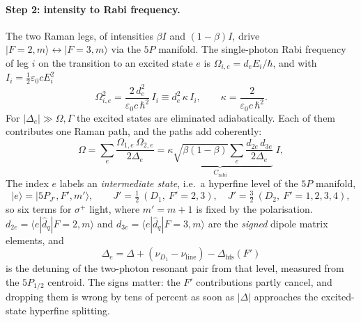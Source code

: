 \paragraph{Step 2: intensity to Rabi frequency.}
The two Raman legs, of intensities $\beta I$ and $(1-\beta)I$, drive
$|F{=}2,m\rangle\leftrightarrow|F{=}3,m\rangle$ via the $5P$ manifold. The
single-photon Rabi frequency of leg $i$ on the transition to an excited state
$e$ is $\Omega_{i,e}=d_e E_i/\hbar$, and with $I_i=\tfrac12\varepsilon_0cE_i^2$
\begin{equation}
\Omega_{i,e}^2=\frac{2\,d_e^2}{\varepsilon_0 c\,\hbar^2}\,I_i
\equiv d_e^2\,\kappa\,I_i,\qquad
\kappa=\frac{2}{\varepsilon_0 c\,\hbar^2} .
\end{equation}
For $|\Delta_e|\gg\Omega,\Gamma$ the excited states are eliminated
adiabatically. Each of them contributes one Raman path, and the paths add
coherently:
\begin{equation}
\Omega=\sum_e\frac{\Omega_{1,e}\,\Omega_{2,e}}{2\Delta_e}
=\underbrace{\kappa\sqrt{\beta(1-\beta)}
\sum_{e}\frac{d_{2e}\,d_{3e}}{2\Delta_e}}_{\textstyle C_\mathrm{rabi}}\;I ,
\end{equation}
The index $e$ labels an \emph{intermediate state}, i.e.\ a hyperfine level of
the $5P$ manifold,
\begin{equation}
|e\rangle=|5P_{J'},F',m'\rangle,\qquad
J'=\tfrac12\ (D_1,\ F'=2,3),\quad J'=\tfrac32\ (D_2,\ F'=1,2,3,4),
\end{equation}
so six terms for $\sigma^+$ light, where $m'=m+1$ is fixed by the polarisation.
$d_{2e}=\langle e|\hat d_{q}|F{=}2,m\rangle$ and
$d_{3e}=\langle e|\hat d_{q}|F{=}3,m\rangle$ are the \emph{signed} dipole matrix
elements, and
\begin{equation}
\Delta_e=\Delta+\left(\nu_{D_1}-\nu_\mathrm{line}\right)-\Delta_\mathrm{hfs}(F')
\end{equation}
is the detuning of the two-photon resonant pair from that level, measured from
the $5P_{1/2}$ centroid. The signs matter: the $F'$ contributions partly cancel,
and dropping them is wrong by tens of percent as soon as $|\Delta|$ approaches
the excited-state hyperfine splitting.

